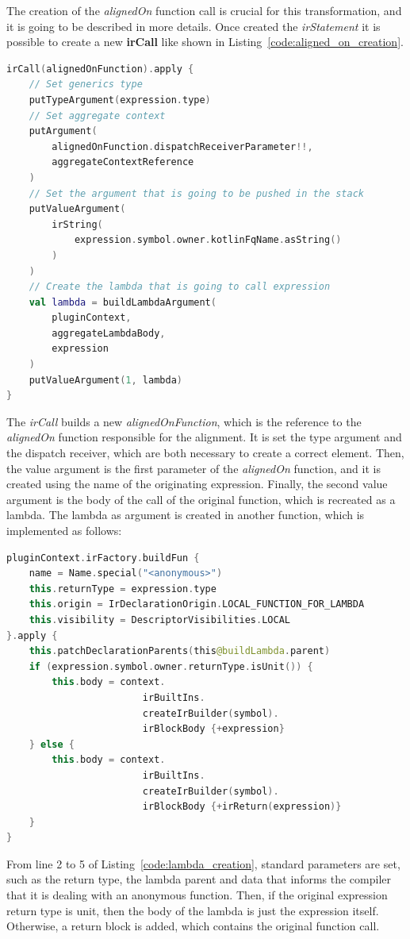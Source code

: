 The creation of the \textit{alignedOn} function call is crucial for this transformation, and it is going to be described in more details.\newline 
Once created the \textit{irStatement} it is possible to create a new \textbf{irCall} like shown in Listing~\ref{code:aligned_on_creation}.
\begin{lstlisting}[caption={Generation of the \textit{alignedOn} function call in Listing~\ref{code:alignedOn_compiler_plugin}}, captionpos=b, language=Kotlin, label={code:aligned_on_creation}]
irCall(alignedOnFunction).apply {
    // Set generics type
    putTypeArgument(expression.type)
    // Set aggregate context
    putArgument(
        alignedOnFunction.dispatchReceiverParameter!!,
        aggregateContextReference
    )
    // Set the argument that is going to be pushed in the stack
    putValueArgument(
        irString(
            expression.symbol.owner.kotlinFqName.asString()
        )
    )
    // Create the lambda that is going to call expression
    val lambda = buildLambdaArgument(
        pluginContext,
        aggregateLambdaBody,
        expression
    )
    putValueArgument(1, lambda)
}
\end{lstlisting}
The \textit{irCall} builds a new \textit{alignedOnFunction}, which is the reference to the \textit{alignedOn} function responsible for the alignment. It is set the type argument and the dispatch receiver, which are both necessary to create a correct element. Then, the value argument is the first parameter of the \textit{alignedOn} function, and it is created using the name of the originating expression. Finally, the second value argument is the body of the call of the original function, which is recreated as a lambda.\newline
The lambda as argument is created in another function, which is implemented as follows:
\begin{lstlisting}[caption={Generation of the lambda body of the \textit{alignedOn} function call in Listing~\ref{code:alignedOn_compiler_plugin}}, captionpos=b, language=Kotlin, label={code:lambda_creation}]
pluginContext.irFactory.buildFun {
    name = Name.special("<anonymous>")
    this.returnType = expression.type
    this.origin = IrDeclarationOrigin.LOCAL_FUNCTION_FOR_LAMBDA
    this.visibility = DescriptorVisibilities.LOCAL
}.apply {
    this.patchDeclarationParents(this@buildLambda.parent)
    if (expression.symbol.owner.returnType.isUnit()) {
        this.body = context.
                        irBuiltIns.
                        createIrBuilder(symbol).
                        irBlockBody {+expression}
    } else {
        this.body = context.
                        irBuiltIns.
                        createIrBuilder(symbol).
                        irBlockBody {+irReturn(expression)}
    }
}
\end{lstlisting}
From line 2 to 5 of Listing~\ref{code:lambda_creation}, standard parameters are set, such as the return type, the lambda parent and data that informs the compiler that it is dealing with an anonymous function. Then, if the original expression return type is unit, then the body of the lambda is just the expression itself. Otherwise, a return block is added, which contains the original function call.

